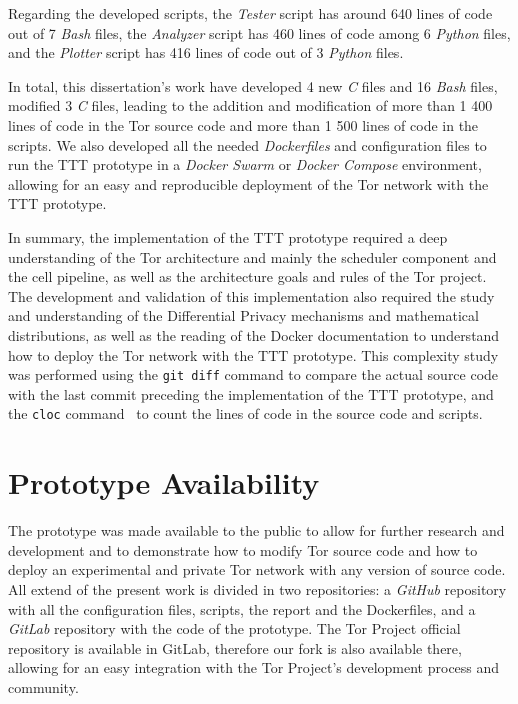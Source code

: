 Regarding the developed scripts, the \textit{Tester} script has around 640 lines of code out of 7 \textit{Bash} files, the \textit{Analyzer} script has 460 lines of code among 6 \textit{Python} files, and the \textit{Plotter} script has 416 lines of code out of 3 \textit{Python} files.

In total, this dissertation's work have developed 4 new \textit{C} files and 16 \textit{Bash} files, modified 3 \textit{C} files, leading to the addition and modification of more than 1 400 lines of code in the Tor source code and more than 1 500 lines of code in the scripts. We also developed all the needed \textit{Dockerfiles} and configuration files to run the TTT prototype in a \textit{Docker Swarm} or \textit{Docker Compose} environment, allowing for an easy and reproducible deployment of the Tor network with the TTT prototype.

In summary, the implementation of the TTT prototype required a deep understanding of the Tor architecture and mainly the scheduler component and the cell pipeline, as well as the architecture goals and rules of the Tor project.  The  development and validation of this implementation also required the study and understanding of the Differential Privacy mechanisms and mathematical distributions, as well as the reading of the Docker documentation to understand how to deploy the Tor network with the TTT prototype. This complexity study was performed using the \texttt{git diff} command to compare the actual source code with the last commit preceding the implementation of the TTT prototype, and the \texttt{cloc} command~\cite{adanial_cloc} to count the lines of code in the source code and scripts. 


\section{Prototype Availability}\label{sec:prototype_availability}
The prototype was made available to the public to allow for further research and development and to demonstrate how to modify Tor source code and how to deploy an experimental and private Tor network with any version of source code. All  extend of the present work is divided in two repositories: a \textit{GitHub} repository with all the configuration files, scripts, the report and the Dockerfiles, and a \textit{GitLab} repository with the code of the prototype. The Tor Project official repository is available in GitLab, therefore our fork is also available there, allowing for an easy integration with the Tor Project's development process and community.

